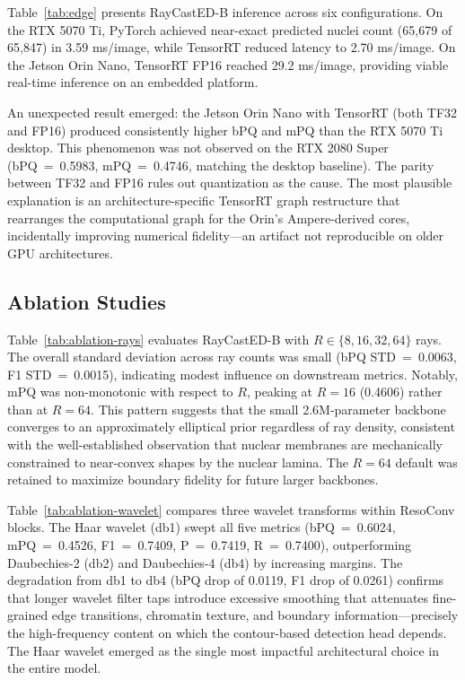 \documentclass[conference]{IEEEtran}
\begin{document}
Table~\ref{tab:edge} presents RayCastED-B inference across six configurations. On the RTX 5070 Ti, PyTorch achieved near-exact predicted nuclei count (65{,}679 of 65{,}847) in 3.59 ms/image, while TensorRT reduced latency to 2.70 ms/image. On the Jetson Orin Nano, TensorRT FP16 reached 29.2 ms/image, providing viable real-time inference on an embedded platform.

An unexpected result emerged: the Jetson Orin Nano with TensorRT (both TF32 and FP16) produced consistently higher bPQ and mPQ than the RTX 5070 Ti desktop. This phenomenon was not observed on the RTX 2080 Super (bPQ~=~0.5983, mPQ~=~0.4746, matching the desktop baseline). The parity between TF32 and FP16 rules out quantization as the cause. The most plausible explanation is an architecture-specific TensorRT graph restructure that rearranges the computational graph for the Orin's Ampere-derived cores, incidentally improving numerical fidelity---an artifact not reproducible on older GPU architectures.

\subsection{Ablation Studies}





Table~\ref{tab:ablation-rays} evaluates RayCastED-B with $R \in \{8, 16, 32, 64\}$ rays. The overall standard deviation across ray counts was small (bPQ STD~=~0.0063, F1 STD~=~0.0015), indicating modest influence on downstream metrics. Notably, mPQ was non-monotonic with respect to $R$, peaking at $R = 16$ (0.4606) rather than at $R = 64$. This pattern suggests that the small 2.6M-parameter backbone converges to an approximately elliptical prior regardless of ray density, consistent with the well-established observation that nuclear membranes are mechanically constrained to near-convex shapes by the nuclear lamina. The $R = 64$ default was retained to maximize boundary fidelity for future larger backbones.

Table~\ref{tab:ablation-wavelet} compares three wavelet transforms within ResoConv blocks. The Haar wavelet (db1) swept all five metrics (bPQ~=~0.6024, mPQ~=~0.4526, F1~=~0.7409, P~=~0.7419, R~=~0.7400), outperforming Daubechies-2 (db2) and Daubechies-4 (db4) by increasing margins. The degradation from db1 to db4 (bPQ drop of 0.0119, F1 drop of 0.0261) confirms that longer wavelet filter taps introduce excessive smoothing that attenuates fine-grained edge transitions, chromatin texture, and boundary information---precisely the high-frequency content on which the contour-based detection head depends. The Haar wavelet emerged as the single most impactful architectural choice in the entire model.
\end{document}
